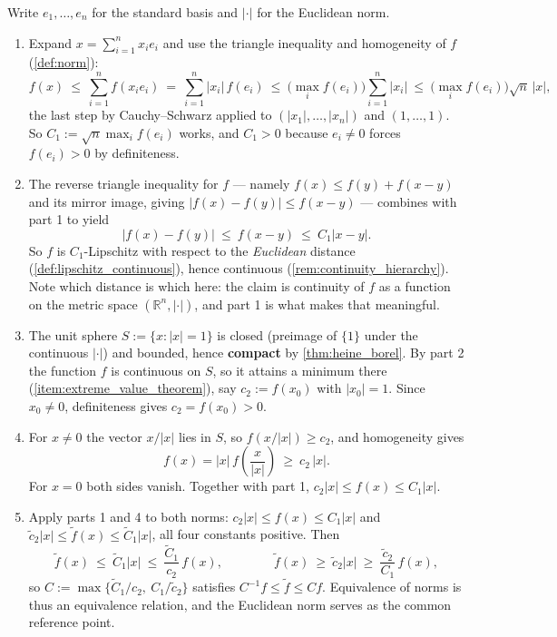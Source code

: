 \begin{exercisesolution}
Write $e_1,\dots,e_n$ for the standard basis and $|\cdot|$ for the Euclidean norm.
\begin{enumerate}[label=\textbf{\arabic*.}]
  \item Expand $x = \sum_{i=1}^n x_ie_i$ and use the triangle inequality and homogeneity of $f$
    (\cref{def:norm}):
    \[f(x) \ \leq\ \sum_{i=1}^n f(x_ie_i) \ =\ \sum_{i=1}^n |x_i|\,f(e_i)
      \ \leq\ \Big(\max_i f(e_i)\Big)\sum_{i=1}^n|x_i|
      \ \leq\ \Big(\max_i f(e_i)\Big)\sqrt n\,|x|,\]
    the last step by Cauchy--Schwarz applied to $(|x_1|,\dots,|x_n|)$ and $(1,\dots,1)$. So
    $C_1 := \sqrt n \max_i f(e_i)$ works, and $C_1 > 0$ because $e_i \neq 0$ forces
    $f(e_i) > 0$ by definiteness.
  \item The reverse triangle inequality for $f$ --- namely $f(x) \leq f(y) + f(x-y)$ and its
    mirror image, giving $|f(x)-f(y)| \leq f(x-y)$ --- combines with part 1 to yield
    \[|f(x)-f(y)| \ \leq\ f(x-y) \ \leq\ C_1|x-y|.\]
    So $f$ is $C_1$-Lipschitz with respect to the \emph{Euclidean} distance
    (\cref{def:lipschitz_continuous}), hence continuous (\cref{rem:continuity_hierarchy}). Note
    which distance is which here: the claim is continuity of $f$ as a function on the metric
    space $(\mathbb{R}^n, |\cdot|)$, and part 1 is what makes that meaningful.
  \item The unit sphere $S := \{x : |x| = 1\}$ is closed (preimage of $\{1\}$ under the
    continuous $|\cdot|$) and bounded, hence \textbf{compact} by \cref{thm:heine_borel}. By part
    2 the function $f$ is continuous on $S$, so it attains a minimum there
    (\cref{item:extreme_value_theorem}), say $c_2 := f(x_0)$ with $|x_0| = 1$. Since $x_0 \neq 0$,
    definiteness gives $c_2 = f(x_0) > 0$.
  \item For $x \neq 0$ the vector $x/|x|$ lies in $S$, so $f(x/|x|) \geq c_2$, and homogeneity
    gives
    \[f(x) = |x|\,f\!\left(\frac{x}{|x|}\right) \ \geq\ c_2\,|x|.\]
    For $x = 0$ both sides vanish. Together with part 1, $c_2|x| \leq f(x) \leq C_1|x|$.
  \item Apply parts 1 and 4 to both norms: $c_2|x| \leq f(x) \leq C_1|x|$ and
    $\tilde c_2|x| \leq \tilde f(x) \leq \tilde C_1|x|$, all four constants positive. Then
    \[\tilde f(x) \ \leq\ \tilde C_1|x| \ \leq\ \frac{\tilde C_1}{c_2}\,f(x),
      \qquad\qquad
      \tilde f(x) \ \geq\ \tilde c_2|x| \ \geq\ \frac{\tilde c_2}{C_1}\,f(x),\]
    so $C := \max\big\{\tilde C_1/c_2,\ C_1/\tilde c_2\big\}$ satisfies
    $C^{-1}f \leq \tilde f \leq Cf$. Equivalence of norms is thus an equivalence relation, and
    the Euclidean norm serves as the common reference point.
\end{enumerate}


\end{exercisesolution}
